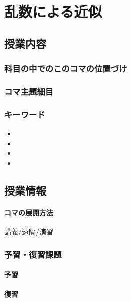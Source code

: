\section{乱数による近似}
\subsection{授業内容}
\subsubsection{科目の中でのこのコマの位置づけ}


\subsubsection{コマ主題細目}
\begin{description}

\end{description}
\subsubsection{キーワード}
\begin{itemize}
	\item 
	\item 
	\item 
	\item 
\end{itemize}
\subsection{授業情報}
\paragraph{コマの展開方法}
講義/遠隔/演習
\subsubsection{予習・復習課題}
\paragraph{予習}
\paragraph{復習}